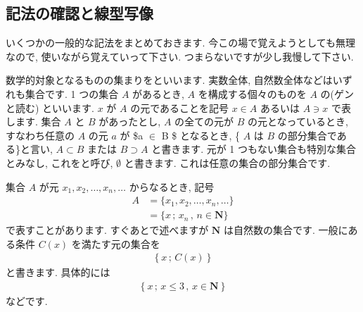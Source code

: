\documentclass[openany, a4paper, oneside]{jsbook}
\begin{document}
\subsection{記法の確認と線型写像}

いくつかの一般的な記法をまとめておきます.
今この場で覚えようとしても無理なので, 使いながら覚えていって下さい.
つまらないですが少し我慢して下さい.

数学的対象となるものの集まりをといいます.
実数全体, 自然数全体などはいずれも集合です. 1 つの集合 $A$ があるとき,
 $A$ を構成する個々のものを $A$ の(ゲンと読む) といいます.
 $x$ が $A$ の元であることを記号 $x\in A$ あるいは $A\ni x$ で表します.
集合 $A$ と $B$ があったとし,  $A$ の全ての元が $B$ の元となっているとき, すなわち任意の $A$ の元 $a$ が \$a $\in$ B \$ となるとき,
\textgt\{ $A$ は $B$ の部分集合である\}と言い,  $A \subset B$ または $B\supset A$ と書きます.
元が 1 つもない集合も特別な集合とみなし, これをと呼び,  $\emptyset$ と書きます.
これは任意の集合の部分集合です.


集合 $A$ が元 $x_{1},x_{2},\dots,x_{n},\dots$ からなるとき, 記号
\begin{align}
    A &= \{ x_{1},x_{2},\dots,x_{n},\dots \}  \\
    &= \{ x \, ; \, x_{n}\, , \, n\in \bm{N} \}
\end{align}
で表すことがあります. すぐあとで述べますが $\bm{N}$ は自然数の集合です.
一般にある条件 $C (x)$ を満たす元の集合を
\begin{align}
    \left \{ x \, ; \, C (x) \right \}
\end{align}
と書きます. 具体的には
\begin{align}
    \left \{ x \, ; \, x \leq 3\, , \, x \in \bm{N} \right \}
\end{align}
などです.
\end{document}
